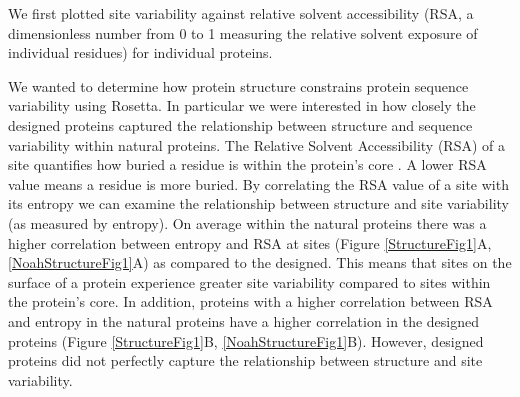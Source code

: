 \documentclass[12pt]{article}
\begin{document}
We first plotted site variability against relative solvent accessibility (RSA, a dimensionless number from 0 to 1 measuring the relative solvent exposure of individual residues) for individual proteins. 


{\color{blue}
We wanted to determine how protein structure constrains protein sequence variability using Rosetta. In particular we were interested in how closely the designed proteins captured the relationship between structure and sequence variability within natural proteins. The Relative Solvent Accessibility (RSA) of a site quantifies how buried a residue is within the protein's core \cite{Franzosa2009}.  A lower RSA value means a residue is more buried. By correlating the RSA value of a site with its entropy we can examine the relationship between structure and site variability (as measured by entropy).  On average within the natural proteins there was a higher correlation between entropy and RSA at sites (Figure \ref{StructureFig1}A, \ref{NoahStructureFig1}A) as compared to the designed. This means that sites on the surface of a protein experience greater site variability compared to sites within the protein's core. In addition, proteins with a higher correlation between RSA and entropy in the natural proteins have a higher correlation in the designed proteins (Figure \ref{StructureFig1}B, \ref{NoahStructureFig1}B). However, designed proteins did not perfectly capture the relationship between structure and site variability. 

}
\end{document}
